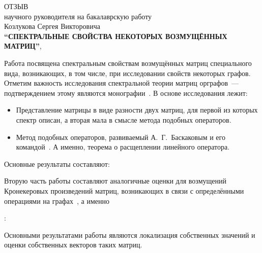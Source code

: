 \begin{center}
  ОТЗЫВ\\
  научного руководителя на бакалаврскую работу\\
  Козлукова Сергея Викторовича\\
  \textbf{``СПЕК\-ТРАЛЬНЫЕ СВОЙ\-СТВА НЕКОТОРЫХ ВОЗМУЩ\-ЁННЫХ МАТРИЦ''},
\end{center}

Работа посвящена спектральным свойствам возмущённых матриц
специального вида, возникающих, в том числе, при исследовании свойств некоторых
графов. Отметим важность исследования спектральной теории матриц орграфов~---%
подтверждением этому являются монографии~\cite{cvetkovic1997eigenspaces,cvetkovic1980spectra,godsil2013algebraic}.
В основе исследования лежит:
\begin{itemize}
  \item Представление матрицы в виде разности двух матриц, для первой из которых
    спектр описан, а вторая мала в смысле метода подобных операторов.
    \item Метод подобных операторов, развиваемый А.~Г.~Баскаковым и его
      командой~\cite{baskakov1986theorem,baskakov1994spectral,baskakov2002splitting}.
      А именно, теорема о расщеплении линейного
      оператора.
\end{itemize}

Основные результаты составляют:

\begin{thm*}
  
\end{thm*}

\begin{thm*}
  
\end{thm*}
    
Вторую часть работы составляют аналогичные оценки для возмущений Кронекеровых
произведений матриц, возникающих в связи с определёнными операциями на
графах~\cite{bellman-matrices-kron,XIANG2005210}, а именно

\begin{thm*}:
  
\end{thm*}
  

Основными результатами работы являются локализация собственных значений и оценки
собственных векторов таких матриц.

